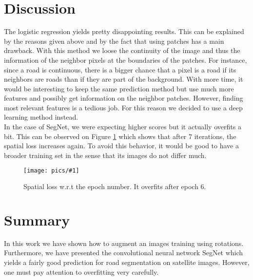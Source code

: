 \documentclass[10pt,conference,compsocconf]{IEEEtran}
\newcommand{\scalefig}[4]{
  \begin{figure}[ht!]
    \centering
    \texttt{[image: pics/\#1]}
 \caption{#3}
    \label{#4}
  \end{figure}}
\begin{document}
\section{Discussion}
The logistic regression yields pretty disappointing results. This can be explained by the reasons given above and by the fact that using patches has a main drawback. With this method we loose the continuity of the image and thus the information of the neighbor pixels at the boundaries of the patches. For instance, since a road is continuous, there is a bigger chance that a pixel is a road if its neighbors are roads than if they are part of the background. With more time, it would be interesting to keep the same prediction method but use much more features and possibly get information on the neighbor patches. However, finding most relevant features is a tedious job. For this reason we decided to use a deep learning method instead.\\
In the case of SegNet, we were expecting higher scores but it actually overfits a bit. This can be observed on Figure \ref{fig:overfit} which shows that after 7 iterations, the spatial loss increases again. To avoid this behavior, it would be good to have a broader training set in the sense that its images do not differ much.

\scalefig{overfitting}{0.9}{Spatial loss w.r.t the epoch number. It overfits after epoch 6.}{fig:overfit}


\section{Summary}
In this work we have shown how to augment an images training using rotations. Furthermore, we have presented the convolutional neural network SegNet which yields a fairly good prediction for road segmentation on satellite images. However, one must pay attention to overfitting very carefully.





\end{document}
